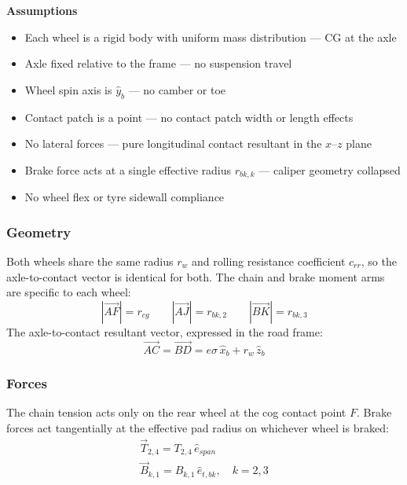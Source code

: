 \documentclass[10pt]{extarticle}
\numberwithin{equation}{subsubsection}
\begin{document}
\textbf{Assumptions}
\begin{itemize}
    \item Each wheel is a rigid body with uniform mass distribution --- CG at the axle
    \item Axle fixed relative to the frame --- no suspension travel
    \item Wheel spin axis is $\hat{y}_b$ --- no camber or toe
    \item Contact patch is a point --- no contact patch width or length effects
    \item No lateral forces --- pure longitudinal contact resultant in the $x$--$z$ plane
    \item Brake force acts at a single effective radius $r_{bk,k}$ --- caliper geometry collapsed
    \item No wheel flex or tyre sidewall compliance
\end{itemize}

\subsubsection{Geometry}

Both wheels share the same radius $r_w$ and rolling resistance coefficient $c_{rr}$, so the axle-to-contact vector is identical for both. The chain and brake moment arms are specific to each wheel:
\begin{equation}
    |\vec{AF}| = r_{cg} \qquad |\vec{AJ}| = r_{bk,2} \qquad |\vec{BK}| = r_{bk,3}
\end{equation}
The axle-to-contact resultant vector, expressed in the road frame:
\begin{equation}
    \vec{AC} = \vec{BD} = e\sigma\,\hat{x}_b + r_w\,\hat{z}_b
\end{equation}

\subsubsection{Forces}

The chain tension acts only on the rear wheel at the cog contact point $F$. Brake forces act tangentially at the effective pad radius on whichever wheel is braked:
\begin{gather}
    \vec{T}_{2,4} = T_{2,4}\,\hat{e}_{span} \\
    \vec{B}_{k,1} = B_{k,1}\,\hat{e}_{t,bk}, \quad k = 2,3
\end{gather}
\end{document}
